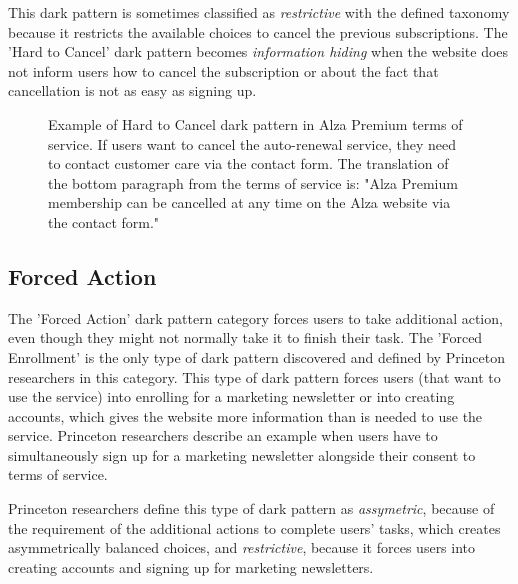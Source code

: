             This dark pattern is sometimes classified as \emph{restrictive} with the defined taxonomy because it restricts the available choices to cancel the previous subscriptions. The 'Hard to Cancel' dark pattern becomes \emph{information hiding} when the website does not inform users how to cancel the subscription or about the fact that cancellation is not as easy as signing up.
        
            \begin{figure}[ht]
                \centering
                \caption{Example of Hard to Cancel dark pattern in Alza Premium terms of service. If users want to cancel the auto-renewal service, they need to contact customer care via the contact form. The translation of the bottom paragraph from the terms of service is: "Alza Premium membership can be cancelled at any time on the Alza website via the contact form."}
                \label{fig:hard-to-cancel-alza}
            \end{figure}
        
            \subsection{Forced Action}
            The 'Forced Action' dark pattern category forces users to take additional action, even though they might not normally take it to finish their task. The 'Forced Enrollment' is the only type of dark pattern discovered and defined by Princeton researchers in this category. This type of dark pattern forces users (that want to use the service) into enrolling for a marketing newsletter or into creating accounts, which gives the website more information than is needed to use the service. Princeton researchers describe an example when users have to simultaneously sign up for a marketing newsletter alongside their consent to terms of service.
        
            Princeton researchers define this type of dark pattern as \emph{assymetric}, because of the requirement of the additional actions to complete users' tasks, which creates asymmetrically balanced choices, and \emph{restrictive}, because it forces users into creating accounts and signing up for marketing newsletters.
        
